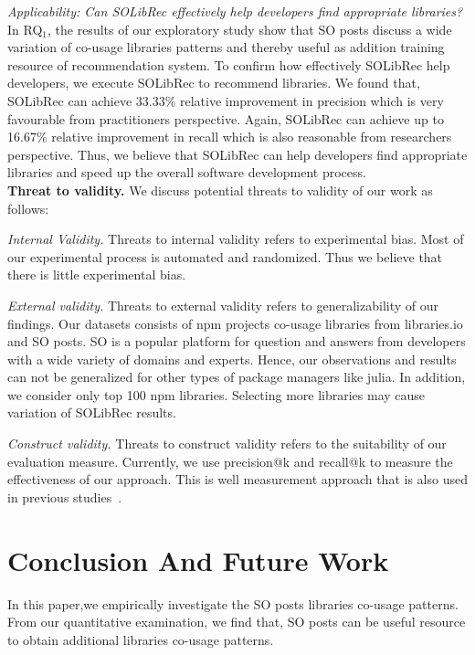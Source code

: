 \documentclass[paper]{ieice}
\begin{document}
\noindent\textit{Applicability: Can SOLibRec effectively help developers find appropriate libraries?}\\
In RQ$_1$, the results of our exploratory study show that SO posts discuss a wide variation of co-usage libraries patterns and thereby useful as addition training resource of recommendation system. To confirm how effectively SOLibRec help developers, we execute SOLibRec to recommend libraries. We found that, SOLibRec can achieve 33.33\% relative improvement in precision which is very favourable from practitioners perspective. Again, SOLibRec can achieve up to 16.67\% relative improvement in recall which is also reasonable from researchers perspective. Thus, we believe that SOLibRec can help developers find appropriate libraries and speed up the overall software development process.\\

\noindent\textbf{Threat to validity.} We discuss potential threats to validity of our work as follows:

\textit{Internal Validity. }  Threats to internal validity refers to experimental bias. Most of our experimental process is automated and randomized. Thus we believe that there is little experimental bias.

\textit{External validity. } Threats to external validity refers to generalizability of our findings. Our datasets consists of npm projects co-usage libraries from libraries.io and SO posts. SO is a popular platform for question and answers from developers with a wide variety of domains and experts. Hence, our observations and results can not be generalized for other types of package managers like julia. In addition, we consider only top 100 npm libraries. Selecting more libraries may cause variation of SOLibRec results. 

\textit{Construct validity. } Threats to construct validity refers to the suitability of our evaluation measure. Currently, we use precision@k and recall@k to measure the effectiveness of our approach. This is well measurement approach that is also used in previous studies~\cite{thung2013automated, nguyen2020crossrec}.

\section{Conclusion And Future Work}
\label{sec:conclusion}
In this paper,we empirically investigate the SO posts libraries co-usage patterns. From our quantitative examination, we find that, SO posts can be useful resource to obtain additional libraries co-usage patterns. 
\end{document}
